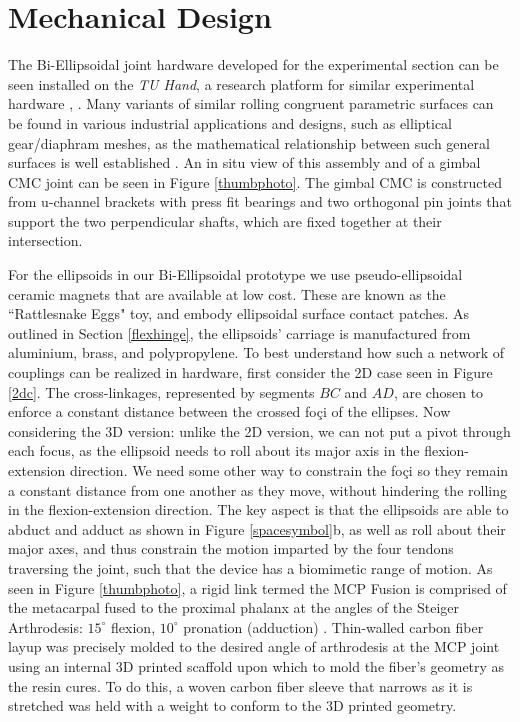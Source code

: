 \documentclass[journal]{IEEEtran}
\begin{document}
\section{Mechanical Design}

\label{mechd}
 The Bi-Ellipsoidal joint hardware developed for the experimental section can be seen installed on the {\it TU Hand}, a research platform for similar experimental hardware \cite{Rake-Tendons}, \cite{rake2}. Many variants of similar rolling congruent parametric surfaces can be found in various industrial applications and designs, such as elliptical gear/diaphram meshes, as the mathematical relationship between such general surfaces is well established \cite{Blake}. An in situ view of this assembly and of a gimbal CMC joint can be seen in Figure \ref{thumbphoto}. The gimbal CMC is constructed from u-channel brackets with press fit bearings and two orthogonal pin joints that support the two perpendicular shafts, which are fixed together at their intersection. 

For the ellipsoids in our Bi-Ellipsoidal prototype we use pseudo-ellipsoidal ceramic magnets that are available at low cost. These are known as the ``Rattlesnake Eggs" toy, and embody ellipsoidal surface contact patches. As outlined in Section \ref{flexhinge}, the ellipsoids' carriage is manufactured from aluminium, brass, and polypropylene. To best understand how such a network of couplings can be realized in hardware, first consider the 2D case seen in Figure \ref{2dc}. The cross-linkages, represented by segments $BC$ and $AD$, are chosen to enforce a constant distance between the crossed foçi of the ellipses. Now considering the 3D version: unlike the 2D version, we can not put a pivot through each focus, as the ellipsoid needs to roll about its major axis in the flexion-extension direction. We need some other way to constrain the foçi so they remain a constant distance from one another as they move, without hindering the rolling in the flexion-extension direction. The key aspect is that the ellipsoids are able to abduct and adduct as shown in Figure \ref{spacesymbol}b, as well as roll about their major axes, and thus constrain the motion imparted by the four tendons traversing the joint, such that the device has a biomimetic range of motion. As seen in Figure \ref{thumbphoto}, a rigid link termed the MCP Fusion is comprised of the metacarpal fused to the proximal phalanx at the angles of the Steiger Arthrodesis: $15^{\circ}$ flexion, $10^{\circ}$ pronation (adduction) \cite{Pulleyking}. Thin-walled carbon fiber layup was precisely molded to the desired angle of arthrodesis at the MCP joint using an internal 3D printed scaffold upon which to mold the fiber's geometry as the resin cures. To do this, a woven carbon fiber sleeve that narrows as it is stretched was held with a weight to conform to the 3D printed geometry. %
\end{document}
